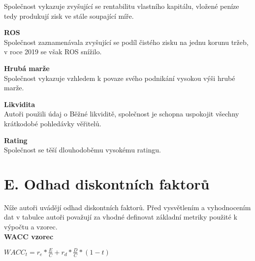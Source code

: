 Společnost vykazuje zvyšující se rentabilitu vlastního kapitálu, vložené peníze tedy produkují zisk ve stále soupající míře.\\

\vspace*{-2mm}

\noindent\textbf{ROS}\\

Společnost zaznamenávala zvyšující se podíl čistého zisku na jednu korunu tržeb, v roce 2019 se však ROS snížilo.\\

\vspace*{-2mm}

\noindent\textbf{Hrubá marže}\\

Společnost vykazuje vzhledem k povaze svého podnikání vysokou výši hrubé marže.\\

\vspace*{-2mm}

\noindent\textbf{Likvidita}\\

Autoři použili údaj o Běžné likviditě, společnost je schopna uspokojit všechny krátkodobé pohledávky věřitelů.\\

\vspace*{-2mm}

\noindent\textbf{Rating}\\

Společnost se těší dlouhodoběmu vysokému ratingu.\\

\newpage

\section*{E. Odhad diskontních faktorů}
\label{sec:Odhad diskontnich faktoru}

Níže autoři uvádějí odhad diskontních faktorů. Před vysvětlením a vyhodnocením dat v tabulce autoři považují za vhodné definovat základní metriky použité k výpočtu a vzorec.\\

\noindent\textbf{WACC vzorec}\\

\begin{center}
$WACC_t = r_e * \frac{E}{C} + r_d * \frac{D}{C} * (1 - t)$\\
\end{center}


